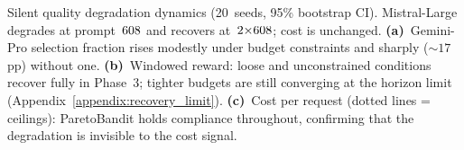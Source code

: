 Silent quality degradation dynamics (20~seeds, 95\% bootstrap CI).  Mistral-Large degrades at prompt~$608$ and recovers at~$2{\times}608$; cost is unchanged.  \textbf{(a)}~Gemini-Pro selection fraction rises modestly under budget constraints and sharply (${\sim}17$\,pp) without one.  \textbf{(b)}~Windowed reward: loose and unconstrained conditions recover fully in Phase~3; tighter budgets are still converging at the horizon limit (Appendix~\ref{appendix:recovery_limit}).  \textbf{(c)}~Cost per request (dotted lines = ceilings): ParetoBandit holds compliance throughout, confirming that the degradation is invisible to the cost signal.
